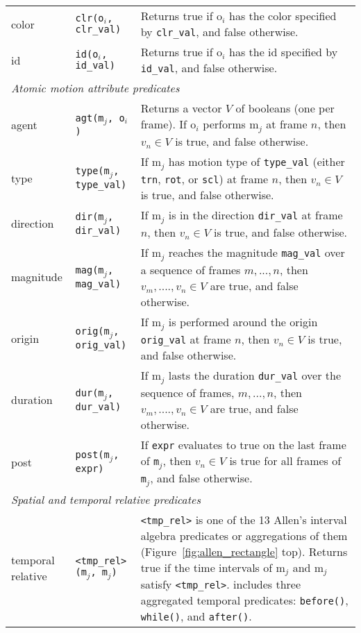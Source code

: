 \begin{table*}[t]
{\begin{tabular}{p{}p{}p{}}
%
color     & 
\texttt{clr(o$_i$, clr\_val)}     & 
Returns true if o$_i$ has the color specified by \texttt{clr\_val}, and false otherwise. \\
%
id     & 
\texttt{id(o$_i$, id\_val)}     & 
Returns true if o$_i$ has the id specified by \texttt{id\_val}, and false otherwise. \\
\hline
\multicolumn{3}{l}{\textit{Atomic motion attribute predicates}} \\
\hline
%
agent &
\texttt{agt(m$_j$, o$_i$)} &
Returns a vector $V$ of booleans (one per frame). If o$_i$ performs m$_j$ at frame $n$, then $v_n \in V$ is true, and false otherwise. \\ 
%
type      & 
\texttt{type(m$_j$, type\_val)}      & 
If m$_j$ has motion type of \texttt{type\_val} (either \texttt{trn}, \texttt{rot}, or \texttt{scl}) at frame $n$, then $v_n \in V$ is true, and false otherwise.    \\
%
direction & 
\texttt{dir(m$_j$, dir\_val)} & 
If m$_j$ is in the direction \texttt{dir\_val} at frame $n$, then $v_n \in V$ is true, and false otherwise.             \\
%
magnitude & 
\texttt{mag(m$_j$, mag\_val)} & 
If m$_j$ reaches the magnitude \texttt{mag\_val} over a sequence of frames $m,...,n$, then $v_m,....,v_n \in V$ are true, and false otherwise.\\
%
origin    & 
\texttt{orig(m$_j$, orig\_val)}   & 
If m$_j$ is performed around the origin \texttt{orig\_val} at frame $n$, then $v_n \in V$ is true, and false otherwise.    \\
%
duration  & 
\texttt{dur(m$_j$, dur\_val)}  & 
If m$_j$ lasts the duration \texttt{dur\_val} over the sequence of frames, $m,...,n$, then $v_m,....,v_n \in V$ are true, and false otherwise.
\\
%
post &
\texttt{post(m$_j$, expr)} &
If \texttt{expr} evaluates to true on the last frame of {\tt m$_j$}, then $v_n \in V$ is true for all frames of {\tt m$_j$}, and false otherwise.\\
\hline
\multicolumn{3}{l}{\textit{Spatial and temporal relative predicates}} \\
\hline
%
temporal relative &
  \texttt{<tmp\_rel>(m$_j$, m$_j$)} &
  \texttt{<tmp\_rel>} is one of the 13 Allen's interval algebra predicates or aggregations of them (Figure~\ref{fig:allen_rectangle} top). Returns true if the time intervals of m$_j$ and m$_j$ satisfy \texttt{<tmp\_rel>}.
      \dslname{} includes three aggregated temporal predicates: \texttt{before()}, \texttt{while()}, and \texttt{after()}.


\end{tabular}}
\end{table*}
